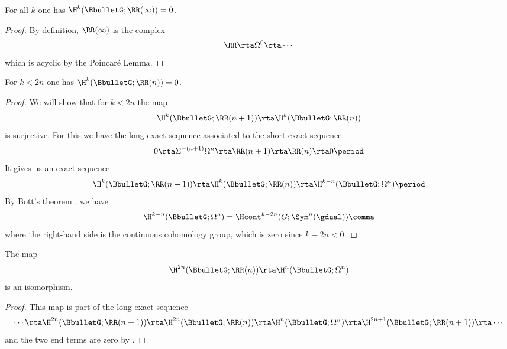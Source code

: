 \begin{prop}
	For all $k$ one has $\H^k(\BbulletG;\RR(\infty))=0$.
\end{prop}

\begin{proof}
	By definition, $\RR(\infty)$ is the complex
	\begin{equation*}
		\RR\rta\Omega^0\rta\cdots
	\end{equation*}
	which is acyclic by the Poincaré Lemma.
\end{proof}

\begin{cor}\label{zero below 2n}
	For $k<2n$ one has $ \H^k(\BbulletG;\RR(n))=0 $.
\end{cor}

\begin{proof}
	We will show that for $k<2n$ the map
	\begin{equation*}
		\H^k(\BbulletG;\RR(n+1))\rta \H^k(\BbulletG;\RR(n))
	\end{equation*}
	is surjective. For this we have the long exact sequence associated to the short exact sequence
	\begin{equation*}
		0\rta\Sigma^{-(n+1)}\Omega^n\rta\RR(n+1)\rta\RR(n)\rta 0 \period
	\end{equation*}
	It gives us an exact sequence
	\begin{equation*}
		\H^k(\BbulletG;\RR(n+1))\rta \H^k(\BbulletG;\RR(n))\rta \H^{k-n}(\BbulletG;\Omega^n) \period
	\end{equation*}
	By Bott's theorem \cite[Theorem 1]{BottPaper}, we have %
	\begin{equation*}
		\H^{k-n}(\BbulletG;\Omega^n)=\Hcont^{k-2n}(G;\Sym^n(\gdual)) \comma
	\end{equation*}
	where the right-hand side is the continuous cohomology group, which is zero since $k-2n<0$.
\end{proof}

\begin{cor}\label{R to Omega}
	The map
	\begin{equation*}
		\H^{2n}(\BbulletG;\RR(n))\rta \H^n(\BbulletG;\Omega^n)
	\end{equation*}
	is an isomorphism.
\end{cor}

\begin{proof}
	This map is part of the long exact sequence
	\begin{equation*}
		\cdots\rta \H^{2n}(\BbulletG;\RR(n+1))\rta \H^{2n}(\BbulletG;\RR(n))\rta \H^{n}(\BbulletG;\Omega^n)\rta \H^{2n+1}(\BbulletG;\RR(n+1))\rta\cdots
	\end{equation*}
	and the two end terms are zero by .
\end{proof}

